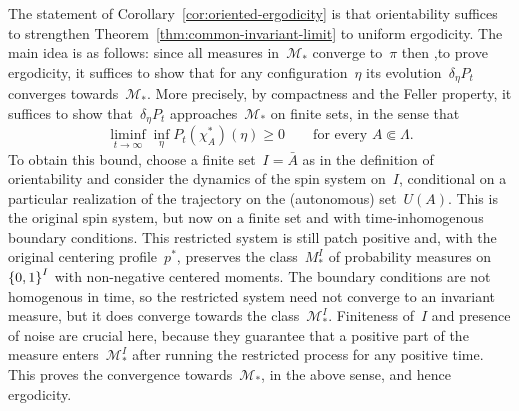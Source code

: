 The statement of Corollary~\ref{cor:oriented-ergodicity} is that orientability suffices to strengthen 
Theorem~\ref{thm:common-invariant-limit} to uniform ergodicity. The main idea is as follows: since all measures in~$\mathcal{M}_*$ converge to~$\pi$ then ,to prove ergodicity, it suffices to show that for any configuration~$\eta$ its evolution~$\delta_\eta P_t$ converges towards~$\mathcal{M}_*$. More precisely, by compactness and the Feller property, it
suffices to show that~$\delta_\eta P_t$ approaches~$\mathcal M_*$ on finite
sets, in the sense that
\begin{equation*}
\liminf_{t\to\infty}\inf_\eta P_t(\chi_A^*)(\eta)\geq0
\qquad\text{for every }A\Subset\Lambda.
\end{equation*}
To obtain this bound, choose a finite set~$I=\bar A$ as in the definition
of orientability and consider the dynamics of the spin system on~$I$, conditional on a particular realization of the trajectory on the (autonomous) set~$U(A)$. This is the original spin system, but now on a finite set and with time-inhomogenous boundary conditions. This restricted system is still patch positive and, with the original
centering profile~$p^*$, preserves the class~$M_*^I$ of probability measures on~$\left\{0,1\right\}^I$ with non-negative centered moments. The boundary conditions are not homogenous in time, so the restricted system need not converge to an invariant measure, but it does converge towards the class~$\mathcal{M}_*^I$. Finiteness of~$I$ and presence of noise are crucial here, because they guarantee that a positive part of the measure enters~$\mathcal{M}_*^I$ after running the restricted process for any positive time. This proves the convergence towards~$\mathcal{M}_*$, in the above sense, and hence ergodicity.

